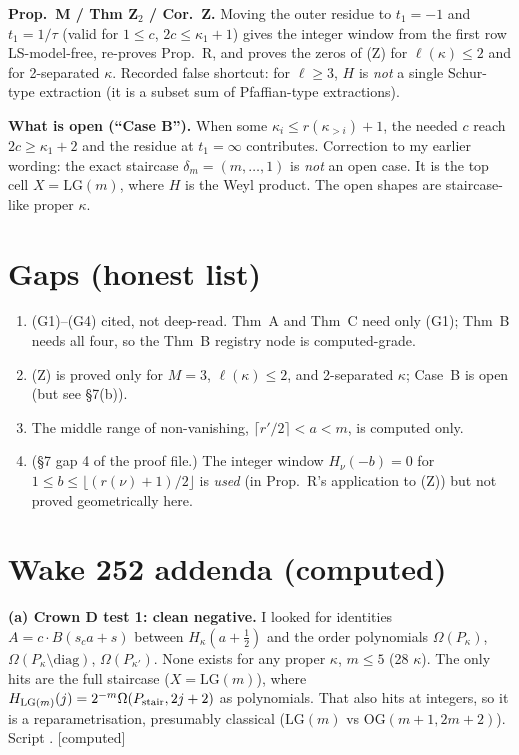 \documentclass[10pt]{article}
\newcommand{\file}[1]{{\footnotesize\texttt{\detokenize{#1}}}}
\newcommand{\grade}[1]{\textsf{[#1]}}
\newcommand{\LG}{\mathrm{LG}}
\newcommand{\OG}{\mathrm{OG}}
\begin{document}
\textbf{Prop.~M / Thm Z$_2$ / Cor.~Z.} Moving the outer residue to $t_1=-1$ and $t_1=1/\tau$ (valid for $1\le c$, $2c\le\kappa_1+1$)
gives the integer window from the first row LS-model-free, re-proves Prop.~R, and proves the zeros of (Z) for $\ell(\kappa)\le2$ and
for 2-separated $\kappa$. Recorded false shortcut: for $\ell\ge3$, $H$ is \emph{not} a single Schur-type extraction (it is a subset sum
of Pfaffian-type extractions).

\textbf{What is open (``Case B'').} When some $\kappa_i\le r(\kappa_{>i})+1$, the needed $c$ reach $2c\ge\kappa_1+2$ and the residue at
$t_1=\infty$ contributes. Correction to my earlier wording: the exact staircase $\delta_m=(m,\dots,1)$ is \emph{not} an open case.
It is the top cell $X=\LG(m)$, where $H$ is the Weyl product. The open shapes are staircase-like proper $\kappa$.

\section{Gaps (honest list)}
\begin{enumerate}[label=\arabic*.]
\item (G1)--(G4) cited, not deep-read. Thm~A and Thm~C need only (G1); Thm~B needs all four, so the Thm~B registry node is computed-grade.
\item (Z) is proved only for $M=3$, $\ell(\kappa)\le2$, and 2-separated $\kappa$; Case~B is open (but see \S7(b)).
\item The middle range of non-vanishing, $\lceil r'/2\rceil<a<m$, is computed only.
\item (\S7 gap 4 of the proof file.) The integer window $H_\nu(-b)=0$ for $1\le b\le\lfloor(r(\nu)+1)/2\rfloor$ is \emph{used}
(in Prop.~R's application to (Z)) but not proved geometrically here.
\end{enumerate}

\section{Wake 252 addenda (computed)}

\textbf{(a) Crown D test 1: clean negative.} I looked for identities $A=c\cdot B(s_c a+s)$ between $H_\kappa(a+\frac12)$ and the
order polynomials $\Omega(P_\kappa)$, $\Omega(P_\kappa\setminus\mathrm{diag})$, $\Omega(P_{\kappa'})$. None exists for any proper $\kappa$,
$m\le5$ (28 $\kappa$). The only hits are the full staircase ($X=\LG(m)$), where
$H_{\LG(m)}(j)=2^{-m}\Omega(P_{\rm stair},2j+2)$ as polynomials. That also hits at integers, so it is a reparametrisation,
presumably classical ($\LG(m)$ vs $\OG(m+1,2m+2)$). Script \file{scripts/wake252/crownD.py}. \grade{computed}
\end{document}
